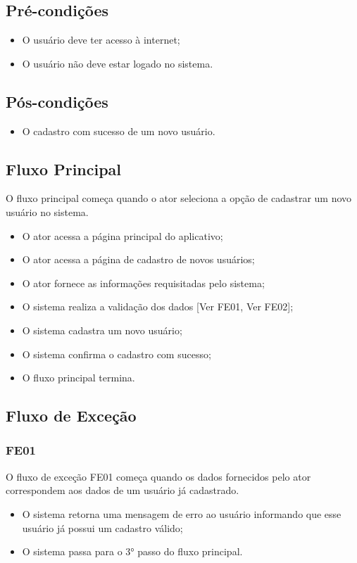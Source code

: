 \begin{anexosenv}
    \subsection{Pré-condições}
        \begin{itemize}
            \item O usuário deve ter acesso à internet;
            \item O usuário não deve estar logado no sistema.
        \end{itemize}
    \subsection{Pós-condições}
        \begin{itemize}
            \item O cadastro com sucesso de um novo usuário.
        \end{itemize}
    \subsection{Fluxo Principal}
        O fluxo principal começa quando o ator seleciona a opção de cadastrar um novo usuário no sistema.
        \begin{itemize}
            \item O ator acessa a página principal do aplicativo;
            \item O ator acessa a página de cadastro de novos usuários;
            \item O ator fornece as informações requisitadas pelo sistema;
            \item O sistema realiza a validação dos dados [Ver FE01, Ver FE02];
            \item O sistema cadastra um novo usuário;
            \item O sistema confirma o cadastro com sucesso;
            \item O fluxo principal termina.
        \end{itemize}
    \subsection{Fluxo de Exceção}
        \subsubsection{FE01}
            O fluxo de exceção FE01 começa quando os dados fornecidos pelo ator correspondem aos dados de um usuário já cadastrado.
            \begin{itemize}
                \item O sistema retorna uma mensagem de erro ao usuário informando que esse usuário já possui um cadastro válido;
                \item O sistema passa para o 3° passo do fluxo principal.
            \end{itemize}

\end{anexosenv}
